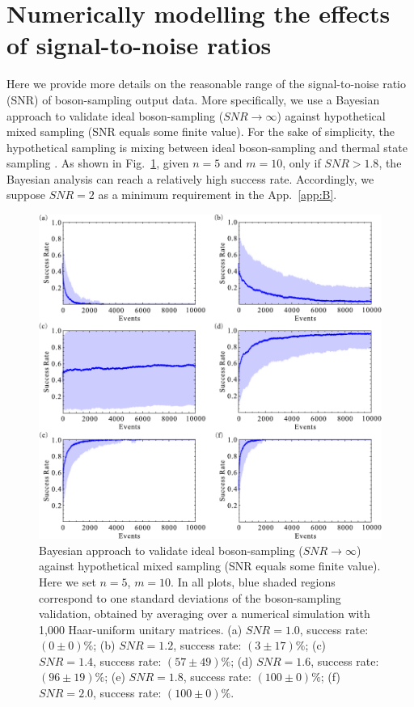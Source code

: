 \documentclass[aps,rmp,twocolumn,amsmath,amssymb,nofootinbib,superscriptaddress]{revtex4}
\begin{document}
\begin{acknowledgments}
\end{acknowledgments}
\appendix

\section{Numerically modelling the effects of signal-to-noise ratios} \label{app:A}

Here we provide more details on the reasonable range of the signal-to-noise ratio (SNR) of boson-sampling output data. More specifically, we use a Bayesian approach \cite{bib:90} to validate ideal boson-sampling (\mbox{$SNR\to\infty$}) against hypothetical mixed sampling (SNR equals some finite value). For the sake of simplicity, the hypothetical sampling is mixing between ideal boson-sampling and thermal state sampling \cite{bib:91}. As shown in Fig.~\ref{fig:SNR}, given \mbox{$n = 5$} and \mbox{$m = 10$}, only if \mbox{$SNR > 1.8$}, the Bayesian analysis can reach a relatively high success rate. Accordingly, we suppose \mbox{$SNR = 2$} as a minimum requirement in the App.~\ref{app:B}.

\begin{figure}[!htb]
\includegraphics[width=1.6\columnwidth]{SNR}
\caption{Bayesian approach to validate ideal boson-sampling (\mbox{$SNR\to\infty$}) against hypothetical mixed sampling (SNR equals some finite value). Here we set \mbox{$n=5$}, \mbox{$m=10$}. In all plots, blue shaded regions correspond to one standard deviations of the boson-sampling validation, obtained by averaging over a numerical simulation with 1,000 Haar-uniform unitary matrices. (a) \mbox{$SNR = 1.0$}, success rate: \mbox{$(0 \pm 0)\% $}; (b) \mbox{$SNR = 1.2$}, success rate: \mbox{$(3 \pm 17)\% $}; (c) \mbox{$SNR = 1.4$}, success rate: \mbox{$(57 \pm 49)\% $}; (d) \mbox{$SNR = 1.6$}, success rate: \mbox{$(96 \pm 19)\% $}; (e) \mbox{$SNR = 1.8$}, success rate: \mbox{$(100 \pm 0)\%$}; (f) \mbox{$SNR = 2.0$}, success rate: \mbox{$(100 \pm 0)\% $}.} \label{fig:SNR}
\end{figure}
\end{document}

